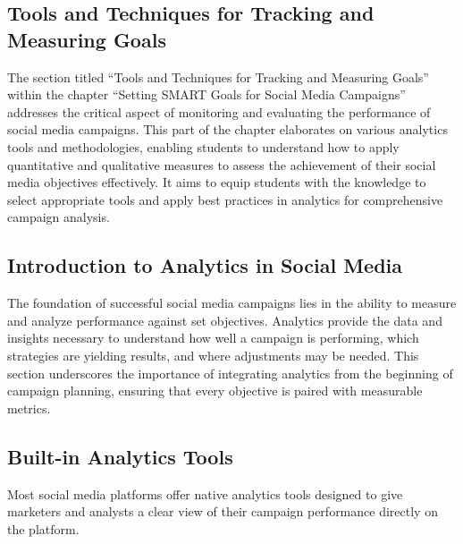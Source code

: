 \documentclass[
]{book}
\begin{document}
\hypertarget{tools-and-techniques-for-tracking-and-measuring-goals}{%
\subsection*{Tools and Techniques for Tracking and Measuring Goals}\label{tools-and-techniques-for-tracking-and-measuring-goals}}

The section titled ``Tools and Techniques for Tracking and Measuring Goals'' within the chapter ``Setting SMART Goals for Social Media Campaigns'' addresses the critical aspect of monitoring and evaluating the performance of social media campaigns. This part of the chapter elaborates on various analytics tools and methodologies, enabling students to understand how to apply quantitative and qualitative measures to assess the achievement of their social media objectives effectively. It aims to equip students with the knowledge to select appropriate tools and apply best practices in analytics for comprehensive campaign analysis.

\hypertarget{introduction-to-analytics-in-social-media}{%
\subsection*{Introduction to Analytics in Social Media}\label{introduction-to-analytics-in-social-media}}

The foundation of successful social media campaigns lies in the ability to measure and analyze performance against set objectives. Analytics provide the data and insights necessary to understand how well a campaign is performing, which strategies are yielding results, and where adjustments may be needed. This section underscores the importance of integrating analytics from the beginning of campaign planning, ensuring that every objective is paired with measurable metrics.

\hypertarget{built-in-analytics-tools}{%
\subsection*{Built-in Analytics Tools}\label{built-in-analytics-tools}}

Most social media platforms offer native analytics tools designed to give marketers and analysts a clear view of their campaign performance directly on the platform.
\end{document}
